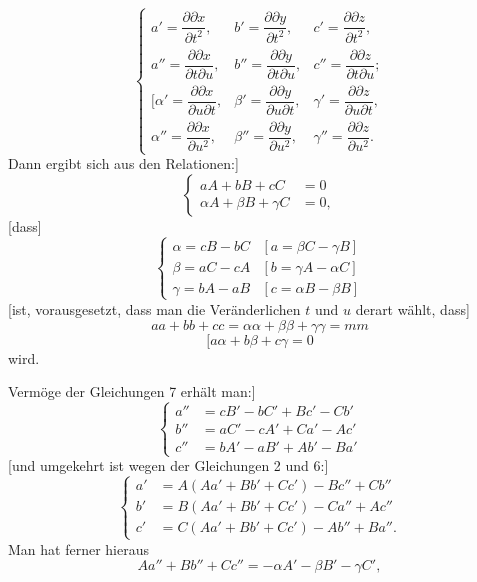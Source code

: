 %
\begin{equation}\tag*{[5]}
\left\{\begin{array}{lll}
a'=\dfrac{\partial\partial x}{\partial t^2},&b'=\dfrac{\partial\partial y}{\partial t^2},&c'=\dfrac{\partial\partial z}{\partial t^2},\\[6pt]
a''=\dfrac{\partial\partial x}{\partial t\partial u},&b''=\dfrac{\partial\partial y}{\partial t\partial u},&c''=\dfrac{\partial\partial z}{\partial t\partial u};\\[6pt]
[\alpha'=\dfrac{\partial\partial x}{\partial u\partial t},&\beta'=\dfrac{\partial\partial y}{\partial u\partial t},&\gamma'=\dfrac{\partial\partial z}{\partial u\partial t},\\[6pt]
\alpha''=\dfrac{\partial\partial x}{\partial u^2},&\beta''=\dfrac{\partial\partial y}{\partial u^2},&\gamma''=\dfrac{\partial\partial z}{\partial u^2}.
\end{array}\right.
\end{equation}
\indent Dann ergibt sich aus den Relationen:]
\begin{equation}\tag*{[6]}
\left\{\begin{aligned}aA+bB+cC&=0\\ \alpha A+\beta B+\gamma C&=0,\end{aligned}\right.
\end{equation}
[dass]
\begin{equation}\tag*{[7]}
\left\{\begin{array}{ll}
\alpha=cB-bC&[a=\beta C-\gamma B]\\
\beta=aC-cA&[b=\gamma A-\alpha C]\\
\gamma=bA-aB&[c=\alpha B-\beta B]
\end{array}\right.
\end{equation}
[ist, vorausgesetzt, dass man die Veränderlichen $t$ und $u$ derart wählt, dass]
\begin{equation}\tag*{[8]}aa+bb+cc=\alpha\alpha+\beta\beta+\gamma\gamma=mm\end{equation}
\begin{equation}\tag*{[9]}[a\alpha+b\beta+c\gamma=0\end{equation}
wird.

Vermöge der Gleichungen 7 erhält man:]
\begin{equation}\tag*{[10]}
\left\{\begin{aligned}
a''&=cB'-bC'+Bc'-Cb'\\
b''&=aC'-cA'+Ca'-Ac'\\
c''&=bA'-aB'+Ab'-Ba'
\end{aligned}\right.
\end{equation}
[und umgekehrt ist wegen der Gleichungen 2 und 6:]
\begin{equation}\tag*{[11]}
\left\{\begin{aligned}
a'&=A(Aa'+Bb'+Cc')-Bc''+Cb''\\
b'&=B(Aa'+Bb'+Cc')-Ca''+Ac''\\
c'&=C(Aa'+Bb'+Cc')-Ab''+Ba''.
\end{aligned}\right.
\end{equation}
\indent Man hat ferner hieraus
\[
Aa''+Bb''+Cc''=-\alpha A'-\beta B'-\gamma C',
\]
